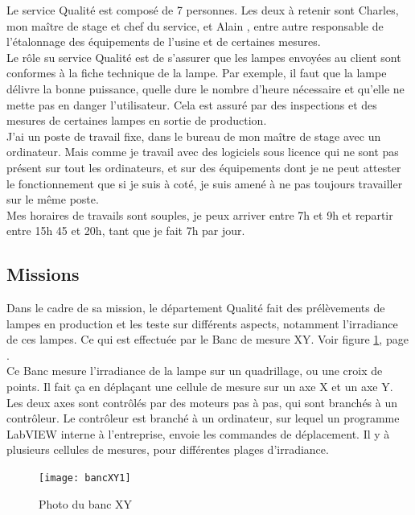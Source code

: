 \documentclass[12pt]{article}
\begin{document}
Le service Qualité est composé de 7 personnes. Les deux à retenir sont Charles, mon maître de stage et chef du service, et Alain , entre autre responsable de l'étalonnage des équipements de l'usine et de certaines mesures.\\
Le rôle su service Qualité est de s'assurer que les lampes envoyées au client sont conformes à la fiche technique de la lampe.
Par exemple, il faut que la lampe délivre la bonne puissance, quelle dure le nombre d'heure nécessaire et qu'elle ne mette pas en danger l'utilisateur.
Cela est assuré par des inspections et des mesures de certaines lampes en sortie de production.\\
J'ai un poste de travail fixe, dans le bureau de mon maître de stage avec un ordinateur.
Mais comme je travail avec des logiciels sous licence qui ne sont pas présent sur tout les ordinateurs, et sur des équipements dont je ne peut attester le fonctionnement que si je suis à coté, je suis amené à ne pas toujours travailler sur le même poste.\\
Mes horaires de travails sont souples, je peux arriver entre 7h et 9h et repartir entre 15h 45 et 20h, tant que je fait 7h par jour.
\newpage

\subsection{Missions}


Dans le cadre de sa mission, le département Qualité fait des prélèvements de lampes en production et les teste sur différents aspects, notamment l'\gls{irradiance} de ces lampes.
Ce qui est effectuée par le Banc de mesure XY.
Voir figure \ref{fig:bancXY1}, page \pageref{fig:bancXY1}.\\
Ce Banc mesure l'irradiance de la lampe sur un quadrillage, ou une croix de points.
Il fait ça en déplaçant une cellule de mesure sur un axe X et un axe Y.
Les deux axes sont contrôlés par des moteurs pas à pas, qui sont branchés à un contrôleur.
Le contrôleur est branché à un ordinateur, sur lequel un programme LabVIEW interne à l'entreprise, envoie les commandes de déplacement.
Il y à plusieurs cellules de mesures, pour différentes plages d'irradiance.\\
\begin{figure}[htb]
	\centering
	\texttt{[image: bancXY1]}
	\caption{Photo du banc XY}
	\label{fig:bancXY1}
\end{figure}
\end{document}
